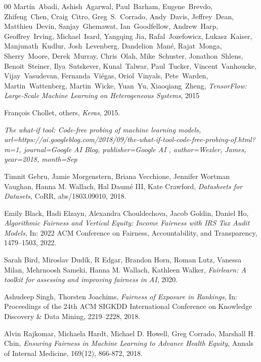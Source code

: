 \documentclass[fleqn,10pt]{wlscirep}
\begin{document}
\begin{thebibliography}{00}
  Mart\'{i}n~Abadi, Ashish~Agarwal, Paul~Barham, Eugene~Brevdo, Zhifeng~Chen, Craig~Citro, Greg~S.~Corrado, Andy~Davis, Jeffrey~Dean, Matthieu~Devin, Sanjay~Ghemawat, Ian~Goodfellow, Andrew~Harp, Geoffrey~Irving, Michael~Isard, Yangqing Jia, Rafal~Jozefowicz, Lukasz~Kaiser, Manjunath~Kudlur, Josh~Levenberg, Dandelion~Man\'{e}, Rajat~Monga, Sherry~Moore, Derek~Murray, Chris~Olah, Mike~Schuster, Jonathon~Shlens, Benoit~Steiner, Ilya~Sutskever, Kunal~Talwar, Paul~Tucker, Vincent~Vanhoucke, Vijay~Vasudevan, Fernanda~Vi\'{e}gas, Oriol~Vinyals, Pete~Warden, Martin~Wattenberg, Martin~Wicke, Yuan~Yu, Xiaoqiang~Zheng,
  \textit{{TensorFlow}: Large-Scale Machine Learning on Heterogeneous Systems},
  {2015}   %


  Fran\c{c}ois Chollet, others,
  \textit{Keras},
  2015.


  \textit{{The what-if tool: Code-free probing of machine learning models}, url={https://ai.googleblog.com/2018/09/the-what-if-tool-code-free-probing-of.html?m=1}, journal={Google AI Blog}, publisher={Google AI }, author={Wexler, James}, year={2018}, month={Sep}}  %



  Timnit Gebru, Jamie Morgenstern, Briana Vecchione, Jennifer Wortman Vaughan, Hanna M. Wallach, Hal Daum\'{e} III, Kate Crawford,
  \textit{Datasheets for Datasets},
  CoRR,
  abs/1803.09010,
  2018.


  Emily Black, Hadi Elzayn, Alexandra Chouldechova, Jacob Goldin, Daniel Ho,
  \textit{Algorithmic Fairness and Vertical Equity: Income Fairness with IRS Tax Audit Models},
  In: 2022 ACM Conference on Fairness, Accountability, and Transparency,
  1479–1503,
  2022.


  Sarah Bird, Miroslav Dud\'ik, R Edgar, Brandon Horn, Roman Lutz, Vanessa Milan, Mehrnoosh Sameki, Hanna M. Wallach, Kathleen Walker,
  \textit{Fairlearn: A toolkit for assessing and improving fairness in AI},
  2020.


  Ashudeep Singh, Thorsten Joachims,
  \textit{Fairness of Exposure in Rankings},
  In: Proceedings of the 24th ACM SIGKDD International Conference on Knowledge Discovery \& Data Mining,
  2219–2228,
  2018.


  Alvin Rajkomar, Michaela Hardt, Michael D. Howell, Greg Corrado, Marshall H. Chin,
  \textit{Ensuring Fairness in Machine Learning to Advance Health Equity},
  Annals of Internal Medicine,
  169(12),
  866-872,
  2018.



\end{thebibliography}
\end{document}
